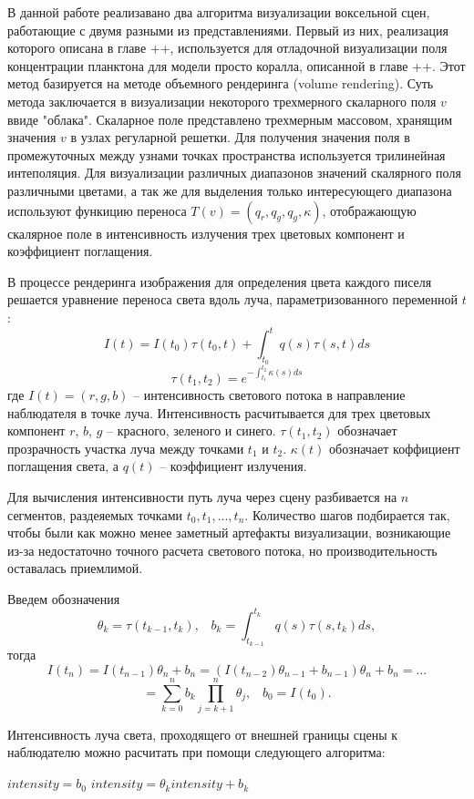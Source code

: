 \documentclass[a4paper,14pt]{extreport}
\begin{document}
В данной работе реализавано два алгоритма визуализации воксельной сцен, работающие с двумя разными из представлениями. Первый из них, реализация которого описана в главе ++, используется для отладочной визуализации поля концентрации планктона для модели просто коралла, описанной в главе ++. Этот метод базируется на методе объемного рендеринга (volume rendering). Суть метода заключается в визуализации некоторого трехмерного скаларного поля $v$ ввиде "облака". Скаларное поле представлено трехмерным массовом, хранящим значения $v$ в узлах регуларной решетки. Для получения значения поля в промежуточных между узнами точках пространства используется трилинейная интеполяция. Для визуализации различных диапазонов значений скалярного поля различными цветами, а так же для выделения только интересующего диапазона используют функицию переноса $T(v) = (q_r, q_g, q_g, \kappa)$, отображающую скалярное поле в интенсивность излучения трех цветовых компонент и коэффициент поглащения.

В процессе рендеринга изображения для определения цвета каждого писеля решается уравнение переноса света вдоль луча, параметризованного переменной $t$: 
$$ I(t) = I(t_0)\tau(t_0, t) + \int_{t_0}^t q(s)\tau(s, t) ds $$
$$ \tau(t_1, t_2) = e^{-\int_{t_1}^{t_2} \kappa(s)ds} $$
где $I(t)=(r, g, b)$ -- интенсивность светового потока в направление наблюдателя в точке луча. Интенсивность расчитывается для трех цветовых компонент $r$, $b$, $g$ -- красного, зеленого и синего. $\tau(t_1, t_2)$ обозначает прозрачность участка луча между точками $t_1$ и $t_2$. $\kappa(t)$ обозначает коффициент поглащения света, а $q(t)$ -- коэффициент излучения.

Для вычисления интенсивности путь луча через сцену разбивается на $n$  сегментов, раздеяемых точками ${t_0, t_1, ..., t_n}$. Количество шагов подбирается так, чтобы были как можно менее заметный артефакты визуализации, возникающие из-за недостаточно точного расчета светового потока, но производительность оставалась приемлимой.

Введем обозначения $$ \theta_k = \tau(t_{k-1}, t_k), \;\;\; b_k = \int_{t_{k-1}}^{t_k}\! q(s)\tau(s, t_k) ds, $$ тогда $$ I(t_n) = I(t_{n-1})\theta_n + b_n = (I(t_{n-2})\theta_{n-1} + b_{n-1})\theta_n + b_n = ...$$ 
$$ = \sum_{k=0}^n b_k \prod_{j=k+1}^n \theta_j, \;\;\; b_0 = I(t_0).$$

Интенсивность луча света, проходящего от внешней границы сцены к наблюдателю можно расчитать при помощи следующего алгоритма:

\begin{algorithmic}
\STATE $intensity = b_0$
\STATE $intensity = \theta_k intensity + b_k$
\ENDFOR
\end{algorithmic}
\end{document}

